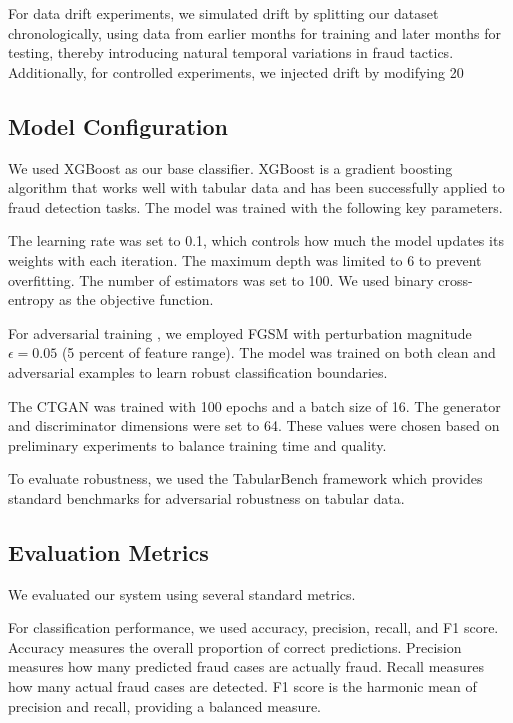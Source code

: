 \documentclass{svproc}
\begin{document}
For data drift experiments, we simulated drift by splitting our dataset chronologically, using data from earlier months for training and later months for testing, thereby introducing natural temporal variations in fraud tactics. Additionally, for controlled experiments, we injected drift by modifying 20%

\subsection{Model Configuration}
We used XGBoost as our base classifier. XGBoost is a gradient boosting algorithm that works well with tabular data and has been successfully applied to fraud detection tasks. The model was trained with the following key parameters.

The learning rate was set to 0.1, which controls how much the model updates its weights with each iteration. The maximum depth was limited to 6 to prevent overfitting. The number of estimators was set to 100. We used binary cross-entropy as the objective function.

For adversarial training \cite{madry2018adversarial}, we employed FGSM with perturbation magnitude $\epsilon = 0.05$ (5 percent of feature range). The model was trained on both clean and adversarial examples to learn robust classification boundaries.

The CTGAN \cite{xu2019ctgan} was trained with 100 epochs and a batch size of 16. The generator and discriminator dimensions were set to 64. These values were chosen based on preliminary experiments to balance training time and quality.

To evaluate robustness, we used the TabularBench framework \cite{simonetto2024tabularbench} which provides standard benchmarks for adversarial robustness on tabular data.

\subsection{Evaluation Metrics}
We evaluated our system using several standard metrics.

For classification performance, we used accuracy, precision, recall, and F1 score. Accuracy measures the overall proportion of correct predictions. Precision measures how many predicted fraud cases are actually fraud. Recall measures how many actual fraud cases are detected. F1 score is the harmonic mean of precision and recall, providing a balanced measure.
\end{document}
